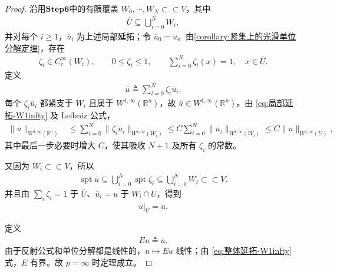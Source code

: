 \documentclass[../../main.tex]{subfiles}
\begin{document}
\begin{proof}
沿用$\mathbf{Step 6}$中的有限覆盖 \(W_0,\cdots ,W_N\subset\subset V\)，其中
\begin{align*}
\overline U\subseteq\bigcup_{i=0}^N W_i,
\end{align*}
并对每个 \(i\geqslant1\)，\(\overline u_i\) 为上述局部延拓；令 \(\overline u_0=u\)。由\cref{corollary:紧集上的光滑单位分解定理}，存在
\begin{align*}
\zeta_i\in C_c^\infty(W_i),\qquad
0\leqslant\zeta_i\leqslant1,\qquad
\sum_{i=0}^N\zeta_i(x)=1,\quad x\in\overline U.
\end{align*}
定义
\begin{align*}
\overline u\triangleq\sum_{i=0}^N\zeta_i\overline u_i.
\end{align*}
每个 \(\zeta_i\overline u_i\) 都紧支于 \(W_i\) 且属于 \(W^{1,\infty}(\mathbb R^n)\)，故 \(\overline u\in W^{1,\infty}(\mathbb R^n)\)。由 \eqref{eq:局部延拓-W1infty} 及 Leibniz 公式，
\begin{align}
\|\overline u\|_{W^{1,\infty}(\mathbb R^n)}
&\leqslant\sum_{i=0}^N\|\zeta_i\overline u_i\|_{W^{1,\infty}(W_i)}
\leqslant C\sum_{i=0}^N\|\overline u_i\|_{W^{1,\infty}(W_i)}
\leqslant C\|u\|_{W^{1,\infty}(U)},
\label{eq:整体延拓-W1infty}
\end{align}
其中最后一步必要时增大 \(C\)，使其吸收 \(N+1\) 及所有 \(\zeta_i\) 的常数。

又因为 \(W_i\subset\subset V\)，所以
\begin{align*}
\operatorname{spt}\overline u
\subseteq\bigcup_{i=0}^N\operatorname{spt}\zeta_i
\subseteq\bigcup_{i=0}^N W_i
\subset\subset V.
\end{align*}
并且由 \(\sum_i\zeta_i=1\) 于 \(\overline U\)、\(\overline u_i=u\) 于 \(W_i\cap U\)，得到
\begin{align*}
\overline u|_U=u.
\end{align*}

定义
\begin{align*}
Eu\triangleq\overline u.
\end{align*}
由于反射公式和单位分解都是线性的，\(u\mapsto Eu\) 线性；由 \eqref{eq:整体延拓-W1infty}式，\(E\) 有界。故 \(p=\infty\) 时定理成立。
\end{proof}
\end{document}
